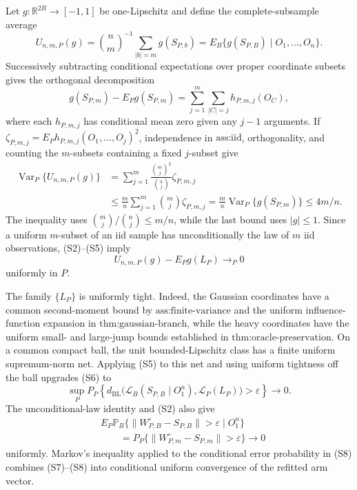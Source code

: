 Let \(g:\mathbb R^{2R}\to[-1,1]\) be one-Lipschitz and define the complete-subsample average
\[
U_{n,m,P}(g)=\binom nm^{-1}\sum_{|b|=m}g(S_{P,b})
=E_B\{g(S_{P,B})\mid O_1,\ldots,O_n\}.
\tag{S3}
\]
Successively subtracting conditional expectations over proper coordinate subsets gives the orthogonal decomposition
\[
g(S_{P,m})-E_Pg(S_{P,m})
=\sum_{j=1}^m\sum_{|C|=j}h_{P,m,j}(O_C),
\tag{S4}
\]
where each \(h_{P,m,j}\) has conditional mean zero given any \(j-1\) arguments. If
\(\zeta_{P,m,j}=E_Ph_{P,m,j}(O_1,\ldots,O_j)^2\), independence in \(\text{ass:iid}\), orthogonality, and counting the \(m\)-subsets containing a fixed \(j\)-subset give
\[
\begin{split}
\operatorname{Var}_P\{U_{n,m,P}(g)\}
&=\sum_{j=1}^m\frac{\binom mj^2}{\binom nj}\zeta_{P,m,j}\\
&\le\frac mn\sum_{j=1}^m\binom mj\zeta_{P,m,j}
=\frac mn\operatorname{Var}_P\{g(S_{P,m})\}
\le4m/n.
\end{split}
\tag{S5}
\]
The inequality uses \(\binom mj/\binom nj\le m/n\), while the last bound uses \(|g|\le1\). Since a uniform \(m\)-subset of an iid sample has unconditionally the law of \(m\) iid observations, (S2)--(S5) imply
\[
U_{n,m,P}(g)-E_Pg(L_P)\to_P0
\tag{S6}
\]
uniformly in \(P\).

The family \(\{L_P\}\) is uniformly tight. Indeed, the Gaussian coordinates have a common second-moment bound by \(\text{ass:finite-variance}\) and the uniform influence-function expansion in \(\text{thm:gaussian-branch}\), while the heavy coordinates have the uniform small- and large-jump bounds established in \(\text{thm:oracle-preservation}\). On a common compact ball, the unit bounded-Lipschitz class has a finite uniform supremum-norm net. Applying (S5) to this net and using uniform tightness off the ball upgrades (S6) to
\[
\sup_PP_P\!\left\{
d_{\mathrm{BL}}\bigl(\mathcal L_B(S_{P,B}\mid O_1^n),
\mathcal L_P(L_P)\bigr)>\varepsilon\right\}\longrightarrow0.
\tag{S7}
\]
The unconditional-law identity and (S2) also give
\[
\begin{split}
&E_P\mathbb P_B\{\|W_{P,B}^{\circ}-S_{P,B}\|>\varepsilon\mid O_1^n\}\\
&\qquad=P_P\{\|W_{P,m}^{\circ}-S_{P,m}\|>\varepsilon\}\longrightarrow0
\end{split}
\tag{S8}
\]
uniformly. Markov's inequality applied to the conditional error probability in (S8) combines (S7)--(S8) into conditional uniform convergence of the refitted arm vector.

